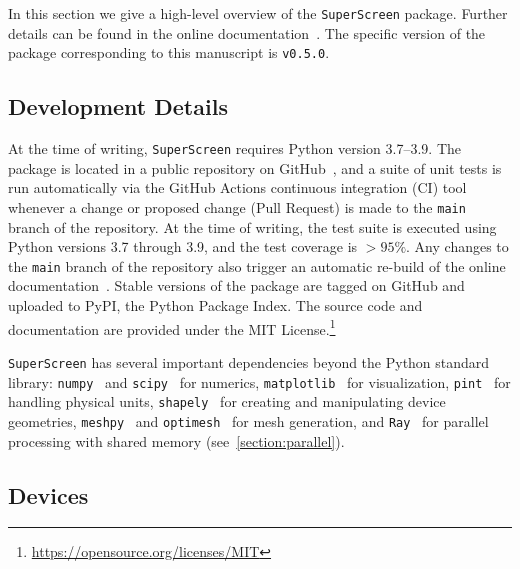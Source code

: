 \documentclass[final,3p,times,twocolumn]{elsarticle}
\newcommand{\inline}[1]{\texttt{#1}\xspace}
\newcommand{\SuperScreen}{\inline{SuperScreen}}
\begin{document}
In this section we give a high-level overview of the \SuperScreen package. Further details can be found in the online documentation~\cite{superscreen-rtd}. The specific version of the package corresponding to this manuscript is \texttt{v0.5.0}.

\subsection{Development Details}
\label{section:overview:development}

At the time of writing, \SuperScreen requires Python version 3.7--3.9. The package is located in a public repository on GitHub~\cite{superscreen, BishopVanHorn2022-bd}, and a suite of unit tests is run automatically via the GitHub Actions continuous integration (CI) tool whenever a change or proposed change (Pull Request) is made to the \inline{main} branch of the repository. At the time of writing, the test suite is executed using Python versions 3.7 through 3.9, and the test coverage is $>95\%$. Any changes to the \inline{main} branch of the repository also trigger an automatic re-build of the online documentation~\cite{superscreen-rtd}. Stable versions of the package are tagged on GitHub and uploaded to PyPI, the Python Package Index. The source code and documentation are provided under the MIT License.\footnote{\href{https://opensource.org/licenses/MIT}{https://opensource.org/licenses/MIT}}

\SuperScreen has several important dependencies beyond the Python standard library: \inline{numpy}~\cite{Harris2020-xv} and \inline{scipy}~\cite{Virtanen2020-zz} for numerics, \inline{matplotlib}~\cite{Hunter2007-il} for visualization, \inline{pint}~\cite{Grecco} for handling physical units, \inline{shapely}~\cite{shapely} for creating and manipulating device geometries, \inline{meshpy}~\cite{Klockner, Shewchuk, Shewchuk1996-va} and \inline{optimesh}~\cite{Schlomer2021-ua} for mesh generation, and \inline{Ray}~\cite{Moritz2018-mt,ray-docs} for parallel processing with shared memory (see~\ref{section:parallel}).

\subsection{Devices}
\label{section:overview:device}
\end{document}
